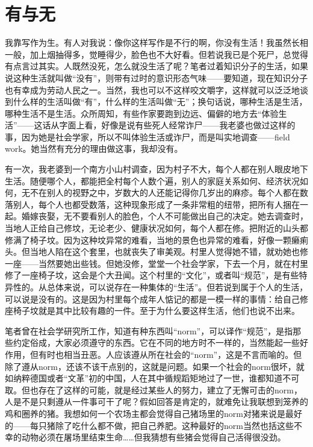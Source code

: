 \chapter{有与无}

 
我靠写作为生。有人对我说：像你这样写作是不行的啊，你没有生活！我虽然长相一般，加上烟抽得多，觉睡得少，脸色也不大好看。但若说我已是个死尸，总觉得有点言过其实。人既然没死，怎么就没生活了呢？笔者过着知识分子的生活，如果说这种生活就叫做“没有”，则带有过时的意识形态气味——要知道，现在知识分子也有幸成为劳动人民之一。当然，我也可以不这样咬文嚼字，这样就可以泛泛地谈到什么样的生活叫做“有”，什么样的生活叫做“无”；换句话说，哪种生活是生活，哪种生活不是生活。众所周知，有些作家要跑到边远、偏僻的地方去“体验生活”——这话从字面上看，好像是说有些死人经常诈尸——我老婆也做过这样的事，因为她是社会学家，所以不叫体验生活或诈尸，而是叫实地调查——field  work。她当然有充分的理由做这事，我却没有。


有一次，我老婆到一个南方小山村调查，因为村子不大，每个人都在别人眼皮地下生活。随便哪个人，都能把全村每个人数个遍，别人的家庭关系如何、经济状况如何，无不在别人的视野之中，岁数大的人还能记得你几岁出的麻疹。每个人都在数落别人，每个人也都受数落，这种现象形成了一条非常粗的纽带，把所有人捆在一起。婚嫁丧娶，无不要看别人的脸色，个人不可能做出自己的决定。她去调查时，当地人正给自己修坟，无论老少、健康状况如何，每个人都在修。把附近的山头都修满了椅子坟。因为这种坟异常的难看，当地的景色也异常的难看，好像一颗癞痢头。但当地人陷在这个套里，也就丧失了审美观。村里人觉得她不错，就劝她也修一座——当然要她出些钱。但她没修，堂堂一个社会学家，下去一个月，就在村里修了一座椅子坟，这会是个大丑闻。这个村里的“文化”，或者叫“规范”，是有些特异性的。从总体来说，可以说存在一种集体的“生活”。但若说到属于个人的生活，可以说是没有的。这是因为村里每个成年人惦记的都是一模一样的事情：给自己修座椅子坟就是其中比较有趣的一件。至于为什么要这样生活，他们也说不出来。


笔者曾在社会学研究所工作，知道有种东西叫“norm”，可以译作“规范”，是指那些约定俗成，大家必须遵守的东西。它在不同的地方时不一样的，当然能起一些好作用，但有时也相当丑恶。人应该遵从所在社会的“norm”，这是不言而喻的。但除了遵从norm，还该不该干点别的，这就是问题。如果一个社会的norm很坏，就如纳粹德国或者“文革”初的中国，人在其中循规蹈矩地过了一世，谁都知道不可取。但也存在了这样的可能，就是经过某些人的努力，建立了无懈可击的norm，人是不是只剩遵从一件事可干了呢？假如回答是肯定的，就难免让我联想到笼养的鸡和圈养的猪。我想如何一个农场主都会觉得自己猪场里的norm对猪来说是最好的——每只猪除了吃什么都不做，把自己养肥。这种最好的norm当然也括这些不幸的动物必须在屠场里结束生命……但我猜想有些猪会觉得自己活得很没劲。



